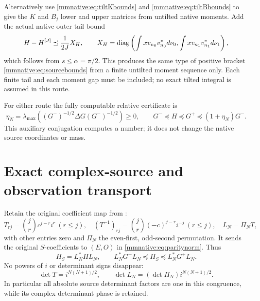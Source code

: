 \documentclass[11pt]{article}
\begin{document}
Alternatively use \eqref{mmnative:eq:tiltKbounds} and
\eqref{mmnative:eq:tiltBbounds} to give the $K$ and $B_j$ lower and upper
matrices from untilted native moments.  Add the actual native outer
tail bound
\begin{equation}\label{mmnative:eq:untiltedouter}
 H-H^{[J]}\preceq\frac1{2J}X_H,\qquad
 X_H=\operatorname{diag}\left(\int xv_{n_0}v_{n_0}^*d\nu_0,
                    \int xv_{n_1}v_{n_1}^*d\nu_1\right),
\end{equation}
which follows from $s\le\alpha=\pi/2$.  This produces the same
type of positive bracket \eqref{mmnative:eq:sourcebounds} from a finite
untilted moment sequence only.  Each finite tail and each moment gap
must be included; no exact tilted integral is assumed in this route.

For either route the fully computable relative certificate is
\begin{equation}\label{mmnative:eq:eta}
 \eta_N=\lambda_{\max}((G^-)^{-1/2}\Delta G(G^-)^{-1/2})\ge0,
 \qquad G^-\preceq H\preceq G^+\preceq(1+\eta_N)G^-.
\end{equation}
This auxiliary conjugation computes a number; it does not change the
native source coordinates or mass.

\section{Exact complex-source and observation transport}

Retain the original coefficient map from \cite{mmnative:PP}:
\begin{equation}\label{mmnative:eq:transport}
 T_{rj}=\binom jr c^{j-r}i^r\ (r\le j),\quad
 (T^{-1})_{rj}=\binom jr(-c)^{j-r}i^{-j}\ (r\le j),\quad
 L_N=\Pi_NT,
\end{equation}
with other entries zero and $\Pi_N$ the even-first, odd-second
permutation.  It sends the original $S$-coefficients to $(E,O)$ in
\eqref{mmnative:eq:paritynorm}.  Thus
\begin{equation}\label{mmnative:eq:Sbounds}
 H_S=L_N^*HL_N,\qquad
 L_N^*G^-L_N\preceq H_S\preceq L_N^*G^+L_N.
\end{equation}
No powers of $i$ or determinant signs disappear:
\[
 \det T=i^{N(N+1)/2},\qquad
 \det L_N=(\det\Pi_N)i^{N(N+1)/2}.
\]
In particular all absolute source determinant factors are one in
this congruence, while its complex determinant phase is retained.
\end{document}
